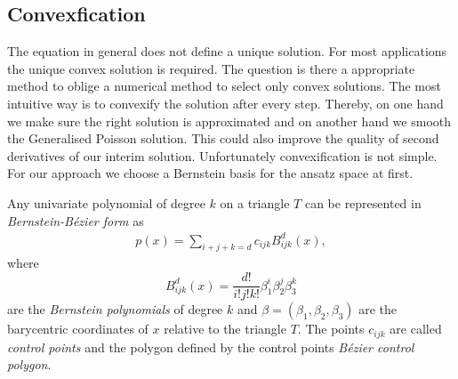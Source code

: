 \subsection{Convexfication} \label{subsec: convexification}
 The \MA equation in general does not define a unique solution. For most applications the unique convex solution is required. The question is there a appropriate method to oblige a numerical method to select only convex solutions.
The most intuitive way is to convexify the solution after every step. Thereby, on one hand we make sure the right solution is approximated and on another hand we smooth the Generalised Poisson solution. This could also improve the quality of second derivatives of our interim solution. %
Unfortunately convexification is not simple. For our approach we choose a Bernstein basis for the ansatz space at first.
\begin{definition}\label{def: BernsteinBezierForm}
	Any univariate polynomial of degree $k$ on a triangle $T$ can be represented in \emph{Bernstein-B\'ezier form} as
\begin{align}
	p(x) = \sum_{i+j+k = d}  c_{ijk} B^d_{ijk}(x),\label{eq: BernsteinBezierForm}
\end{align}
where
\[
	B^d_{ijk}(x) = \frac {d!}{i!j!k!} \beta_1^i \beta_2^j \beta_3^k
\]
are the \emph{Bernstein polynomials} of degree $k$ and $\beta = (\beta_1, \beta_2, \beta_3)$ are the barycentric coordinates of $x$ relative to the triangle $T$.
The points $c_{ijk}$ are called \emph{control points} and the polygon defined by the control points \emph{B\'ezier control polygon}.
\end{definition}

